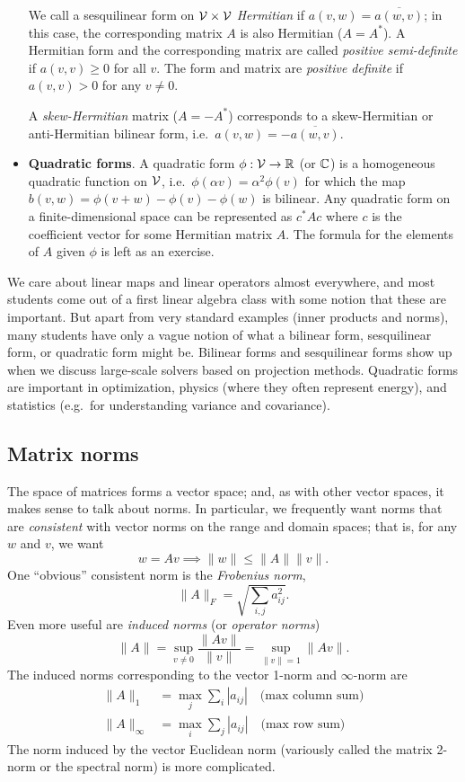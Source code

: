\documentclass[12pt, leqno]{article} %
\begin{document}
\begin{itemize}
  We call a sesquilinear form on $\mathcal{V} \times \mathcal{V}$ {\em Hermitian} if
  $a(v,w) = \overline{a(w,v)}$; in this case, the corresponding matrix $A$ is
  also Hermitian ($A = A^*$).  A Hermitian form and the corresponding
  matrix are called {\em positive semi-definite} if $a(v,v) \geq 0$
  for all $v$.  The form and matrix are {\em positive definite} if
  $a(v,v) > 0$ for any $v \neq 0$.

  A {\em skew-Hermitian} matrix
  ($A = -A^*$) corresponds to a skew-Hermitian or anti-Hermitian bilinear
  form, i.e.~$a(v,w) = -\overline{a(w,v)}$.
\item {\bf Quadratic forms}.  A quadratic form $\phi : \mathcal{V}
  \rightarrow \mathbb{R}$ (or $\mathbb{C}$) is a homogeneous quadratic function
  on $\mathcal{V}$, i.e.~$\phi(\alpha v) = \alpha^2 \phi(v)$ for which the
  map $b(v,w) = \phi(v+w) - \phi(v) - \phi(w)$ is bilinear.
  Any quadratic form on a finite-dimensional space can be
  represented as $c^* A c$ where $c$ is the coefficient vector for
  some Hermitian matrix $A$.  The formula for the elements of $A$
  given $\phi$ is left as an exercise.
\end{itemize}
We care about linear maps and linear operators almost everywhere, and
most students come out of a first linear algebra class with some
notion that these are important.  But apart from very standard
examples (inner products and norms), many students have only a vague
notion of what a bilinear form, sesquilinear form, or quadratic form
might be.  Bilinear forms and sesquilinear forms show up when we
discuss large-scale solvers based on projection methods.  Quadratic
forms are important in optimization, physics (where they often
represent energy), and statistics (e.g.~for understanding variance and
covariance).

\subsection{Matrix norms}

The space of matrices forms a vector space; and, as with other vector
spaces, it makes sense to talk about norms.  In particular, we
frequently want norms that are {\em consistent} with vector norms
on the range and domain spaces; that is, for any $w$ and $v$,
we want
\[
  w = Av \implies \|w\| \leq \|A\| \|v\|.
\]
One ``obvious'' consistent norm is the {\em Frobenius norm},
\[
  \|A\|_F = \sqrt{ \sum_{i,j} a_{ij}^2 }.
\]
Even more useful are {\em induced norms} (or {\em operator norms})
\[
  \|A\| = \sup_{v \neq 0} \frac{\|Av\|}{\|v\|} = \sup_{\|v\|=1} \|Av\|.
\]
The induced norms corresponding to the vector 1-norm and $\infty$-norm
are
\begin{align*}
  \|A\|_1 &= \max_j \sum_i |a_{ij}| \quad \mbox{(max column sum)}\\
  \|A\|_\infty &= \max_i \sum_j |a_{ij}| \quad \mbox{(max row sum)}
\end{align*}
The norm induced by the vector Euclidean norm (variously called
the matrix 2-norm or the spectral norm) is more complicated.
\end{document}
